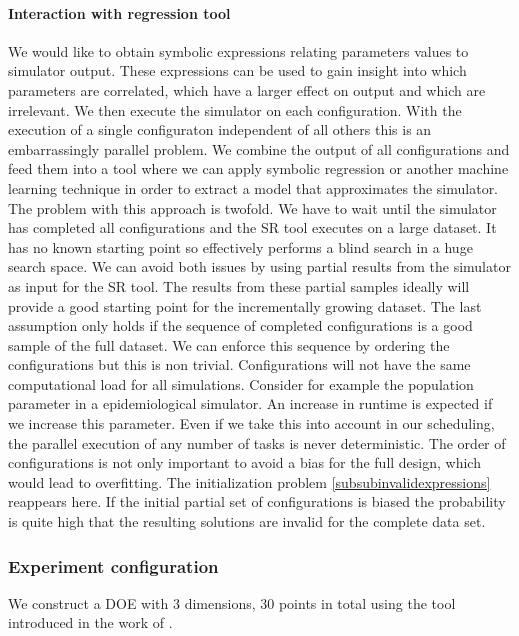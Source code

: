\paragraph{Interaction with regression tool}
We would like to obtain symbolic expressions relating parameters values to simulator output. These expressions can be used to gain insight into which parameters are correlated, which have a larger effect on output and which are irrelevant. 
We then execute the simulator on each configuration. With the execution of a single configuraton independent of all others this is an embarrassingly parallel problem. We combine the output of all configurations and feed them into a tool where we can apply symbolic regression or another machine learning technique in order to extract a model that approximates the simulator. The problem with this approach is twofold. We have to wait until the simulator has completed all configurations and the SR tool executes on a large dataset. It has no known starting point so effectively performs a blind search in a huge search space. We can avoid both issues by using partial results from the simulator as input for the SR tool. The results from these partial samples ideally will provide a good starting point for the incrementally growing dataset. The last assumption only holds if the sequence of completed configurations is a good sample of the full dataset. We can enforce this sequence by ordering the configurations but this is non trivial. Configurations will not have the same computational load for all simulations. Consider for example the population parameter in a epidemiological simulator. An increase in runtime is expected if we increase this parameter. Even if we take this into account in our scheduling, the parallel execution of any number of tasks is never deterministic. The order of configurations is not only important to avoid a bias for the full design, which would lead to overfitting. The initialization problem \ref{subsubinvalidexpressions} reappears here. If the initial partial set of configurations is biased the probability is quite high that the resulting solutions are invalid for the complete data set. 

\subsubsection{Experiment configuration}
We construct a DOE with 3 dimensions, 30 points in total using the tool introduced in the work of \citep{DOE}. %
